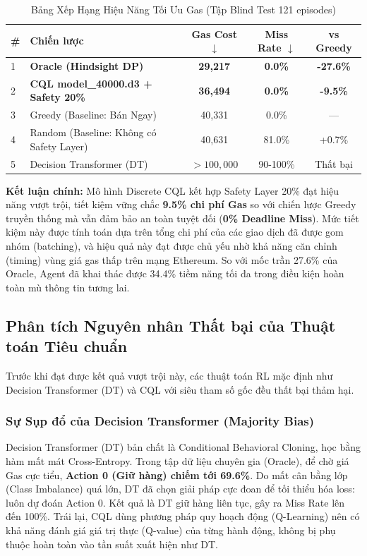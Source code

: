 \begin{table}[H]
\centering
\caption{Bảng Xếp Hạng Hiệu Năng Tối Ưu Gas (Tập Blind Test 121 episodes)}
\label{tab:final_leaderboard}
\begin{tabular}{llccc}
\hline
\textbf{\#} & \textbf{Chiến lược} & \textbf{Gas Cost $\downarrow$} & \textbf{Miss Rate $\downarrow$} & \textbf{vs Greedy} \\
\hline
1 & \textbf{Oracle (Hindsight DP)} & \textbf{29,217} & \textbf{0.0\%} & \textbf{-27.6\%} \\
2 & \textbf{CQL model\_40000.d3 + Safety 20\%} & \textbf{36,494} & \textbf{0.0\%} & \textbf{-9.5\%} \\
3 & Greedy (Baseline: Bán Ngay) & 40,331 & 0.0\% & --- \\
4 & Random (Baseline: Không có Safety Layer) & 40,631 & 81.0\% & +0.7\% \\
5 & Decision Transformer (DT) & $>100,000$ & 90-100\% & Thất bại \\
\hline
\end{tabular}
\end{table}

\textbf{Kết luận chính:} Mô hình Discrete CQL kết hợp Safety Layer 20\% đạt hiệu năng vượt trội, tiết kiệm vững chắc \textbf{9.5\% chi phí Gas} so với chiến lược Greedy truyền thống mà vẫn đảm bảo an toàn tuyệt đối (\textbf{0\% Deadline Miss}). Mức tiết kiệm này được tính toán dựa trên tổng chi phí của các giao dịch đã được gom nhóm (batching), và hiệu quả này đạt được chủ yếu nhờ khả năng căn chỉnh (timing) vùng giá gas thấp trên mạng Ethereum. So với mốc trần 27.6\% của Oracle, Agent đã khai thác được 34.4\% tiềm năng tối đa trong điều kiện hoàn toàn mù thông tin tương lai.

\subsection{Phân tích Nguyên nhân Thất bại của Thuật toán Tiêu chuẩn}

Trước khi đạt được kết quả vượt trội này, các thuật toán RL mặc định như Decision Transformer (DT) và CQL với siêu tham số gốc đều thất bại thảm hại. 

\subsubsection{Sự Sụp đổ của Decision Transformer (Majority Bias)}
Decision Transformer (DT) \cite{chen2021decision} bản chất là Conditional Behavioral Cloning, học bằng hàm mất mát Cross-Entropy. Trong tập dữ liệu chuyên gia (Oracle), để chờ giá Gas cực tiểu, \textbf{Action 0 (Giữ hàng) chiếm tới 69.6\%}. Do mất cân bằng lớp (Class Imbalance) quá lớn, DT đã chọn giải pháp cực đoan để tối thiểu hóa loss: luôn dự đoán Action 0. Kết quả là DT giữ hàng liên tục, gây ra Miss Rate lên đến 100\%. Trái lại, CQL dùng phương pháp quy hoạch động (Q-Learning) nên có khả năng đánh giá giá trị thực (Q-value) của từng hành động, không bị phụ thuộc hoàn toàn vào tần suất xuất hiện như DT.


